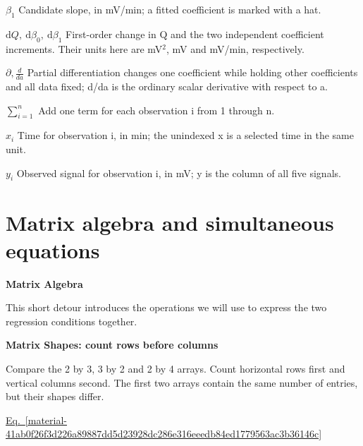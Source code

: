 \documentclass[11pt,a4paper]{article}
\begin{document}
\begin{minipage}{\linewidth}
\par\noindent\textbf{\(\beta_1\)} Candidate slope, in mV/min; a fitted coefficient is marked with a hat.

\par\noindent\textbf{\(\mathrm dQ,\ \mathrm d\beta_0,\ \mathrm d\beta_1\)} First-order change in Q and the two independent coefficient increments. Their units here are mV\ensuremath{{}^2}, mV and mV/min, respectively.

\par\noindent\textbf{\(\partial,\frac{d}{da}\)} Partial differentiation changes one coefficient while holding other coefficients and all data fixed; d/da is the ordinary scalar derivative with respect to a.

\par\noindent\textbf{\(\sum_{i=1}^{n}\)} Add one term for each observation i from 1 through n.

\par\noindent\textbf{\(x_i\)} Time for observation i, in min; the unindexed x is a selected time in the same unit.

\par\noindent\textbf{\(y_i\)} Observed signal for observation i, in mV; y is the column of all five signals.

\end{minipage}\par
\medskip

\clearpage
\section{Matrix algebra and simultaneous equations}
\textbf{Matrix Algebra}


This short detour introduces the operations we will use to express the two regression conditions together.


\textbf{Matrix Shapes: count rows before columns}


Compare the 2 by 3, 3 by 2 and 2 by 4 arrays. Count horizontal rows first and vertical columns second. The first two arrays contain the same number of entries, but their shapes differ.


\hyperref[material-41ab0f26f3d226a89887dd5d23928dc286e316eeedb84ed1779563ac3b36146c]{Eq.~\ref*{material-41ab0f26f3d226a89887dd5d23928dc286e316eeedb84ed1779563ac3b36146c}}
\end{document}

